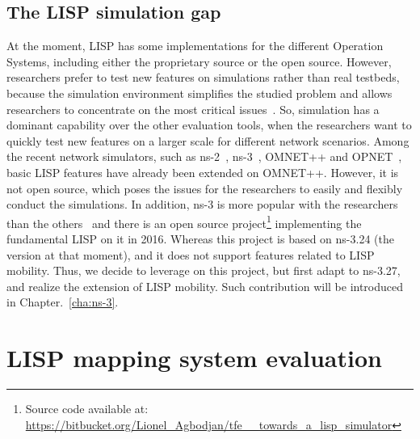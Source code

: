 \subsection{The LISP simulation gap}
\label{subsec:implementation_missing}
At the moment, LISP has some implementations for the different Operation Systems, including either the proprietary source or the open source. However, researchers prefer to test new features on simulations rather than real testbeds, because the simulation environment simplifies the studied problem and allows researchers to concentrate on the most critical issues~\cite{moller2011simulation}. So, simulation has a dominant capability over the other evaluation tools, when the researchers want to quickly test new features on a larger scale for different network scenarios. Among the recent network simulators, such as ns-2~\cite{breslau2000advances}, ns-3~\cite{henderson2008network}, OMNET++ and OPNET~\cite{chang1999network}, basic LISP features have already been extended on OMNET++. However, it is not open source, which poses the issues for the researchers to easily and flexibly conduct the simulations. In addition, ns-3 is more popular with the researchers than the others~\cite{rana2017implementation} and there is an open source project\footnote{Source code available at:\\ \url{https://bitbucket.org/Lionel_Agbodjan/tfe__towards_a_lisp_simulator}} implementing the fundamental LISP on it in 2016. Whereas this project is based on ns-3.24 (the version at that moment), and it does not support features related to LISP mobility. Thus, we decide to leverage on this project, but first adapt to ns-3.27, and realize the extension of LISP mobility. Such contribution will be introduced in Chapter.~\ref{cha:ns-3}. 

\section{LISP mapping system evaluation}
\label{sec:mds}

